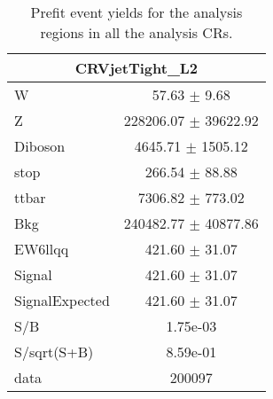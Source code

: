 \begin{table}
{\begin{tabular}{|l|c|}
\hline
\multicolumn{2}{|c|}{CRVjetTight\_L2}\\ \hline
W & 57.63 $\pm$ 9.68\\
Z & 228206.07 $\pm$ 39622.92\\
Diboson & 4645.71 $\pm$ 1505.12\\
stop & 266.54 $\pm$ 88.88\\
ttbar & 7306.82 $\pm$ 773.02\\
\hline
Bkg & 240482.77 $\pm$ 40877.86\\
\hline
EW6llqq & 421.60 $\pm$ 31.07\\
\hline
Signal & 421.60 $\pm$ 31.07\\
SignalExpected & 421.60 $\pm$ 31.07\\
\hline
S/B & 1.75e-03\\
S/sqrt(S+B) & 8.59e-01\\
\hline
data & 200097\\ \hline
\end{tabular}
}
\label{tab:ComboPrefitYield_CR}
\caption{Prefit event yields for the analysis regions in all the analysis CRs.}
\end{table}



